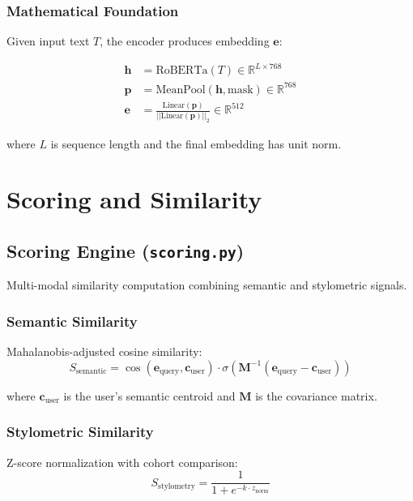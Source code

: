 \documentclass[12pt,a4paper]{article}
\begin{document}
\subsubsection{Mathematical Foundation}
Given input text $T$, the encoder produces embedding $\mathbf{e}$:

\begin{align}
\mathbf{h} &= \text{RoBERTa}(T) \in \mathbb{R}^{L \times 768} \\
\mathbf{p} &= \text{MeanPool}(\mathbf{h}, \text{mask}) \in \mathbb{R}^{768} \\
\mathbf{e} &= \frac{\text{Linear}(\mathbf{p})}{||\text{Linear}(\mathbf{p})||_2} \in \mathbb{R}^{512}
\end{align}

where $L$ is sequence length and the final embedding has unit norm.

\section{Scoring and Similarity}

\subsection{Scoring Engine (\texttt{scoring.py})}

Multi-modal similarity computation combining semantic and stylometric signals.

\subsubsection{Semantic Similarity}
Mahalanobis-adjusted cosine similarity:
\begin{equation}
S_{\text{semantic}} = \cos(\mathbf{e}_{\text{query}}, \mathbf{c}_{\text{user}}) \cdot \sigma(\mathbf{M}^{-1}(\mathbf{e}_{\text{query}} - \mathbf{c}_{\text{user}}))
\end{equation}

where $\mathbf{c}_{\text{user}}$ is the user's semantic centroid and $\mathbf{M}$ is the covariance matrix.

\subsubsection{Stylometric Similarity}
Z-score normalization with cohort comparison:
\begin{equation}
S_{\text{stylometry}} = \frac{1}{1 + e^{-k \cdot z_{\text{norm}}}}
\end{equation}
\end{document}
